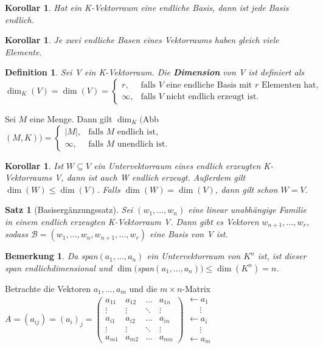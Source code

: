 \documentclass[12pt,a4paper]{article}
\theoremstyle{plain}
\newtheorem{Satz}[Theorem]{Satz}
\newtheorem{Korollar}[Theorem]{Korollar}
\newtheorem{Definition}[Theorem]{Definition}
\newtheorem{Bemerkung}[Theorem]{Bemerkung}
\newcommand{\herv}[1]{{\emph{\textbf{#1}}}}
\numberwithin{equation}{section}
\begin{document}
\begin{Korollar}
Hat ein K-Vektorraum eine endliche Basis, dann ist jede Basis endlich.
\end{Korollar}
\begin{Korollar}
Je zwei endliche Basen eines Vektorraums haben gleich viele Elemente.
\end{Korollar}
\begin{Definition}
Sei V ein K-Vektorraum. Die \herv{Dimension} von V ist definiert als $\dim_K(V)=\dim(V)=\left\lbrace\begin{array}{ll} r,&\text{falls }V\text{ eine endliche Basis mit }r\text{ Elementen hat,}\\\infty,&\text{falls }V\text{ nicht endlich erzeugt ist.} \end{array}\right.$
\end{Definition}
Sei $M$ eine Menge. Dann gilt $\dim_K($Abb$(M,K))=\left\lbrace\begin{array}{ll}|M|,&\text{falls }M\text{ endlich ist,}\\ \infty,&\text{falls }M\text{ unendlich ist.}\end{array}\right.$
\begin{Korollar}
Ist $W\subseteq V$ ein Untervektorraum eines endlich erzeugten K-Vektorraums V, dann ist auch W endlich erzeugt. Außerdem gilt $\dim(W)\leq \dim(V)$. Falls $\dim(W)=\dim(V)$, dann gilt schon $W=V$.
\end{Korollar}
\begin{Satz}[Basisergänzungssatz]
Sei $(w_1,\ldots,w_n)$ eine linear unabhängige Familie in einem endlich erzeugten K-Vektorraum V. Dann gibt es Vektoren $w_{n+1},\ldots,w_r$, sodass $\mathcal{B}=(w_1,\ldots,w_n,w_{n+1},\ldots,w_r)$ eine Basis von V ist.
\end{Satz}
\begin{Bemerkung}
Da span$(a_1,\ldots,a_n)$ ein Untervektorraum von $K^n$ ist, ist dieser span endlichdimensional und $\dim($span$(a_1,\ldots,a_n))\leq \dim(K^n)=n$.
\end{Bemerkung}
Betrachte die Vektoren $a_1,\ldots,a_m$ und die $m\times n$-Matrix \\$A=(a_{ij})=(a_i)_j=\left(\begin{matrix}
a_{11} & a_{12} & \ldots & a_{1n}\\
\vdots & \vdots & \ddots & \vdots \\
a_{i1} & a_{i2} & \ldots & a_{in} \\
\vdots & \vdots & \ddots & \vdots \\
a_{m1} & a_{m2} & \ldots & a_{mn}
\end{matrix} \right) \begin{array}{l}
\gets a_1 \\
\quad ~~ \vdots\\
\gets a_i \\
\quad ~~\vdots\\
\gets a_m \end{array}$ \\
\end{document}
